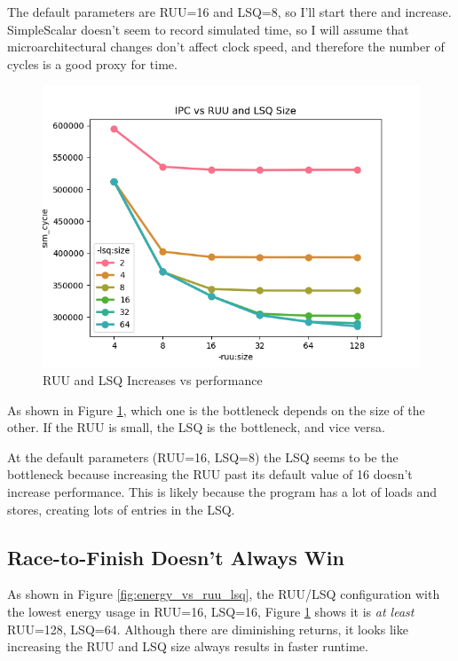 \documentclass{article}
\begin{document}
\begin{multicols}{2}
  The default parameters are RUU=16 and LSQ=8, so I'll start there and increase. SimpleScalar doesn't seem to record simulated time, so I will assume that microarchitectural changes don't affect clock speed, and therefore the number of cycles is a good proxy for time.

  \begin{figure}[H]
    \centering
    \includegraphics[width=\linewidth]{./assets/ruu_and_lsq_vs_sim_time.png}
    \caption{RUU and LSQ Increases vs performance}
    \label{fig:ruu_or_lsq_bottleneck}
  \end{figure}

  As shown in Figure \ref{fig:ruu_or_lsq_bottleneck}, which one is the bottleneck depends on the size of the other. If the RUU is small, the LSQ is the bottleneck, and vice versa.

  At the default parameters (RUU=16, LSQ=8) the LSQ seems to be the bottleneck because increasing the RUU past its default value of 16 doesn't increase performance. This is likely because the program has a lot of loads and stores, creating lots of entries in the LSQ.

  \subsection{Race-to-Finish Doesn't Always Win}
  As shown in Figure \ref{fig:energy_vs_ruu_lsq}, the RUU/LSQ configuration with the lowest energy usage in RUU=16, LSQ=16, Figure \ref{fig:ruu_or_lsq_bottleneck} shows it is \textit{at least} RUU=128, LSQ=64. Although there are diminishing returns, it looks like increasing the RUU and LSQ size always results in faster runtime.


\end{multicols}
\end{document}
